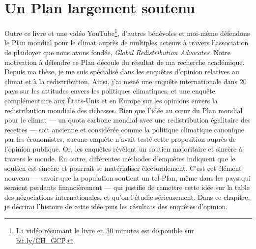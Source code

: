 \documentclass[a5paper,french,openany]{memoir}
\begin{document}

\chapter{Un Plan largement soutenu\label{ch:soutien}}

Outre ce livre et une vidéo YouTube\footnote{La vidéo résumant le livre en 30 minutes est disponible sur \href{https://bit.ly/CH_GCP}{bit.ly/CH\_GCP}.}, d'autres bénévoles et moi-même défendons le Plan mondial pour le climat auprès de multiples acteurs à travers l'association de plaidoyer que nous avons fondée, \textit{Global Redistribution Advocates}. %
Notre motivation à défendre ce Plan découle du résultat de ma recherche académique. Depuis ma thèse, je me suis spécialisé dans les enquêtes d'opinion relatives au climat et à la redistribution. Ainsi, j'ai mené une enquête internationale dans 20 pays sur les attitudes envers les politiques climatiques, et une enquête complémentaire aux États-Unis et en Europe sur les opinions envers la redistribution mondiale des richesses. Bien que l'idée au cœur du Plan mondial pour le climat --- un quota carbone mondial avec une redistribution égalitaire des recettes --- soit ancienne et considérée comme la politique climatique canonique par les économistes, aucune enquête n'avait testé cette proposition auprès de l'opinion publique. Or, les enquêtes révèlent un soutien majoritaire et sincère à travers le monde. En outre, différentes méthodes d'enquêtes indiquent que le soutien est sincère et pourrait se matérialiser électoralement. 
C'est cet élément nouveau --- savoir que la population soutient un tel Plan, même dans les pays qui seraient perdants financièrement --- qui justifie de remettre cette idée sur la table des négociations internationales, et qu'on l'étudie sérieusement. Dans ce chapitre, je décrirai l'histoire de cette idée puis les résultats des enquêtes d'opinion.
\end{document}
